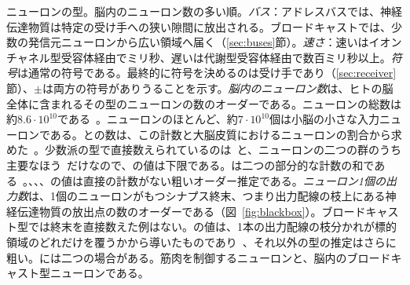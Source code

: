 \begin{table}[t]
\caption{ニューロンの型。脳内のニューロン数の多い順。\emph{バス}：アドレスバスでは、神経伝達物質は特定の受け手への狭い隙間に放出される。ブロードキャストでは、少数の発信元ニューロンから広い領域へ届く（\ref{sec:buses}節）。\emph{速さ}：速いはイオンチャネル型受容体経由でミリ秒、遅いは代謝型受容体経由で数百ミリ秒以上。\emph{符号}は通常の符号である。最終的に符号を決めるのは受け手であり（\ref{sec:receiver}節）、$\pm$は両方の符号がありうることを示す。\emph{脳内のニューロン数}は、ヒトの脳全体に含まれるその型のニューロンの数のオーダーである。ニューロンの総数は約$8.6\cdot10^{10}$である~\cite{Azevedo2009}。ニューロンのほとんど、約$7\cdot10^{10}$個は小脳の小さな入力ニューロンである。との数は、この計数と大脳皮質におけるニューロンの割合から求めた~\cite{Hendry1987}。少数派の型で直接数えられているのは~\cite{Airaksinen1991}と、ニューロンの二つの群のうち主要なほう~\cite{Pakkenberg1991}だけなので、の値は下限である。は二つの部分的な計数の和である~\cite{Baker1990,Baker1991}。、、、の値は直接の計数がない粗いオーダー推定である。\emph{ニューロン1個の出力数}は、1個のニューロンがもつシナプス終末、つまり出力配線の枝上にある神経伝達物質の放出点の数のオーダーである（図~\ref{fig:blackbox}）。ブロードキャスト型では終末を直接数えた例はない。の値は、1本の出力配線の枝分かれが標的領域のどれだけを覆うかから導いたものであり~\cite{Matsuda2009}、それ以外の型の推定はさらに粗い。には二つの場合がある。筋肉を制御するニューロンと、脳内のブロードキャスト型ニューロンである。}
\label{tab:types}
\end{table}


